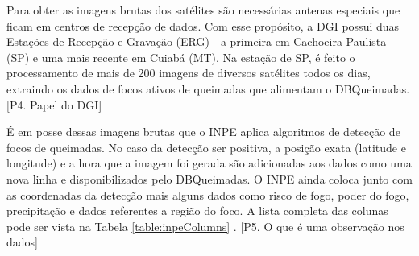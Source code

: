 \documentclass[cic,tc]{iiufrgs}
\begin{document}
Para obter as imagens brutas dos satélites são necessárias antenas especiais que 
ficam em centros de recepção de dados. Com esse propósito, a DGI possui duas 
Estações de Recepção e Gravação (ERG) - a primeira 
em Cachoeira Paulista (SP) e uma mais recente em Cuiabá (MT). Na estação de SP, é 
feito o processamento de mais de 200 imagens de diversos satélites todos os dias, 
extraindo os dados de focos ativos de queimadas que alimentam o DBQueimadas. 
\citep{SiteDGI} [P4. Papel do DGI] \par

É em posse dessas imagens brutas que o INPE aplica algoritmos de detecção de 
focos de queimadas. No caso da detecção ser positiva, a posição exata (latitude e 
longitude) e a hora que a imagem foi gerada são
adicionadas aos dados como uma nova linha e disponibilizados pelo DBQueimadas. 
O INPE ainda coloca junto com as coordenadas da detecção mais alguns dados como 
risco de fogo, poder do fogo, precipitação e dados referentes a região do foco. 
A lista completa das colunas pode ser vista na Tabela \ref{table:inpeColumns}
 \cite{PerguntasFrequentesINPE}.
[P5. O que é uma observação nos dados] \par
\end{document}
